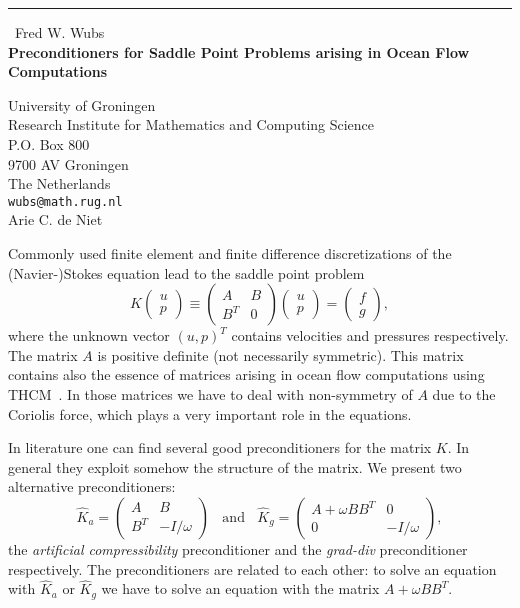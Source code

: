 \documentclass{report}
\begin{document}
\begin{center}
\rule{6in}{1pt} \
{\large Fred W. Wubs \\
{\bf Preconditioners for Saddle Point Problems arising in Ocean Flow Computations}}

University of Groningen \\ Research Institute for Mathematics and Computing Science \\ P.O. Box 800 \\ 9700 AV Groningen \\ The Netherlands
\\
{\tt wubs@math.rug.nl}\\
Arie C. de Niet\end{center}

Commonly used finite element and finite difference discretizations of the
(Navier-)Stokes equation lead to the saddle point problem
\[
K \left(\begin{array}{c}
u \\ p \end{array}\right)\equiv
\left(\begin{array}{cc}
A & B\\ B^T & 0 \end{array}\right)
\left(\begin{array}{c}
u \\ p \end{array}\right)=
\left(\begin{array}{c}
f \\ g \end{array}\right),
\]
where the unknown vector $(u,p)^T$ contains velocities and pressures
respectively. The matrix $A$ is positive definite (not necessarily
symmetric). This matrix contains also the essence of matrices arising in
ocean flow
computations using THCM~\cite{THCM2}. In those matrices we have to deal with
non-symmetry of $A$ due to the Coriolis force, which plays a very important
role in the equations.

In literature one can find several good preconditioners for the matrix
$K$. In general they exploit somehow the structure of the matrix. We
present two alternative preconditioners:
\[
\hat K_a = \left(\begin{array}{cc} A & B\\ B^T & -I/\omega \end{array}\right)
\;\;\mbox{ and } \;\;
\hat K_g = \left(\begin{array}{cc} A +\omega BB^T & 0\\ 0 & -I/\omega \end{array}\right),
\]
the {\it artificial compressibility} preconditioner and the {\it
grad-div} preconditioner respectively. The preconditioners are related to each other: to
solve an equation with $\hat K_a$ or $\hat K_g$ we have to solve an equation
with the matrix $A+\omega B B^T$.
\end{document}
